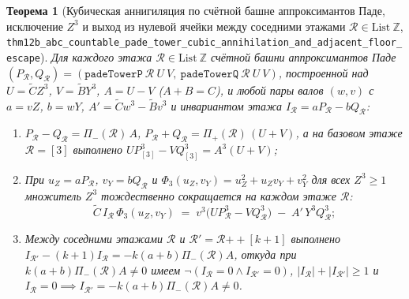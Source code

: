 \documentclass[11pt,a4paper]{article}
\theoremstyle{plain}
\newtheorem{theorem}{Теорема}[section]
\theoremstyle{definition}
\begin{document}
\begin{theorem}[Кубическая аннигиляция по счётной башне аппроксимантов Паде, исключение $Z^3$ и выход из нулевой ячейки между соседними этажами $\mathcal{R}\in\mathrm{List}\ \mathbb{Z}$, \texttt{thm12b\_abc\_countable\_pade\_tower\_cubic\_annihilation\_and\_adjacent\_floor\_escape}]
\label{thm:countable-pade-tower-thm12b}
Для каждого этажа $\mathcal{R}\in\mathrm{List}\ \mathbb{Z}$ счётной башни аппроксимантов Паде $(P_{\mathcal{R}},Q_{\mathcal{R}}) = (\texttt{padeTowerP}\ \mathcal{R}\ U\ V,\ \texttt{padeTowerQ}\ \mathcal{R}\ U\ V)$, построенной над $U = \widetilde{C}Z^3$, $V = \widetilde{B}Y^3$, $A = U - V$ ($A + B = C$), и любой пары валов $(w,v)$ с $a = v Z$, $b = w Y$, $A' = \widetilde{C}w^3 - \widetilde{B}v^3$ и инвариантом этажа $I_{\mathcal{R}} = a P_{\mathcal{R}} - b Q_{\mathcal{R}}$:
\begin{enumerate}[label=\textbf{(\roman*)},leftmargin=*,noitemsep]
\item $P_{\mathcal{R}} - Q_{\mathcal{R}} = \Pi_-(\mathcal{R})\,A$, $P_{\mathcal{R}} + Q_{\mathcal{R}} = \Pi_+(\mathcal{R})\,(U + V)$, а на базовом этаже $\mathcal{R} = [3]$ выполнено $U P_{[3]}^3 - V Q_{[3]}^3 = A^3(U + V)$;
\item При $u_Z = a P_{\mathcal{R}}$, $v_Y = b Q_{\mathcal{R}}$ и $\Phi_3(u_Z,v_Y) = u_Z^2 + u_Z v_Y + v_Y^2$ для всех $Z^3 \ge 1$ множитель $Z^3$ тождественно сокращается на каждом этаже $\mathcal{R}$:
  \begin{equation}
    \label{eq:abc-arbitrary-floor-z3-cancel}
    \widetilde{C}\,I_{\mathcal{R}}\,\Phi_3(u_Z, v_Y) \;=\; v^3\bigl(U P_{\mathcal{R}}^3 - V Q_{\mathcal{R}}^3\bigr) \;-\; A'\,Y^3 Q_{\mathcal{R}}^3;
  \end{equation}
\item Между соседними этажами $\mathcal{R}$ и $\mathcal{R}' = \mathcal{R}\mathbin{++}[k+1]$ выполнено $I_{\mathcal{R}'} - (k+1)I_{\mathcal{R}} = -k(a+b)\Pi_-(\mathcal{R})A$, откуда при $k(a+b)\Pi_-(\mathcal{R})A \ne 0$ имеем $\neg(I_{\mathcal{R}} = 0 \land I_{\mathcal{R}'} = 0)$, $|I_{\mathcal{R}}| + |I_{\mathcal{R}'}| \ge 1$ и $I_{\mathcal{R}} = 0 \implies I_{\mathcal{R}'} = -k(a+b)\Pi_-(\mathcal{R})A \ne 0$.
\end{enumerate}
\end{theorem}
\end{document}
